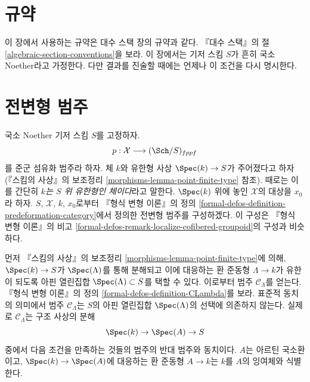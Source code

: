 \section{규약}
\label{section-conventions}

\noindent
이 장에서 사용하는 규약은 대수 스택 장의 규약과 같다.
『대수 스택』의 절 \ref{algebraic-section-conventions}을 보라.
이 장에서는 기저 스킴 $S$가 흔히 국소 Noether라고 가정한다.
다만 결과를 진술할 때에는 언제나 이 조건을 다시 명시한다.





\section{전변형 범주}
\label{section-predeformation-categories}

\noindent
국소 Noether 기저 스킴 $S$를 고정하자.
$$
p : \mathcal{X} \longrightarrow (\Sch/S)_{fppf}
$$
를 준군 섬유화 범주라 하자. 체 $k$와 유한형 사상
$\Spec(k) \to S$가 주어졌다고 하자(『스킴의 사상』의 보조정리
\ref{morphisms-lemma-point-finite-type} 참조). 때로는 이를 간단히
{\it $k$는 $S$ 위 유한형인 체이다}라고 말한다. $\Spec(k)$ 위에 놓인
$\mathcal{X}$의 대상을 $x_0$라 하자. $S$, $\mathcal{X}$, $k$, $x_0$로부터
『형식 변형 이론』의 정의
\ref{formal-defos-definition-predeformation-category}에서 정의한
전변형 범주를 구성하겠다. 이 구성은 『형식 변형 이론』의 비고
\ref{formal-defos-remark-localize-cofibered-groupoid}의 구성과 비슷하다.

\medskip\noindent
먼저 『스킴의 사상』의 보조정리
\ref{morphisms-lemma-point-finite-type}에 의해, $\Spec(k) \to S$가
$\Spec(\Lambda)$를 통해 분해되고 이에 대응하는 환 준동형
$\Lambda \to k$가 유한이 되도록 아핀 열린집합
$\Spec(\Lambda) \subset S$를 택할 수 있다. 이로부터 범주
$\mathcal{C}_\Lambda$를 얻는다. 『형식 변형 이론』의 정의
\ref{formal-defos-definition-CLambda}를 보라. 표준적 동치의 의미에서
범주 $\mathcal{C}_\Lambda$는 $S$의 아핀 열린집합
$\Spec(\Lambda)$의 선택에 의존하지 않는다. 실제로
$\mathcal{C}_\Lambda$는 구조 사상의 분해
\begin{equation}
\label{equation-factor}
\Spec(k) \to \Spec(A) \to S
\end{equation}
중에서 다음 조건을 만족하는 것들의 범주의 반대 범주와 동치이다.
$A$는 아르틴 국소환이고, $\Spec(k) \to \Spec(A)$에 대응하는 환 준동형
$A \to k$는 $k$를 $A$의 잉여체와 식별한다.

